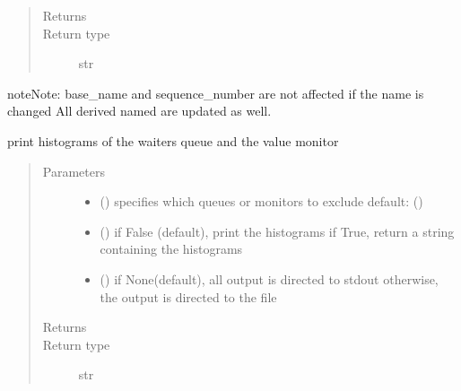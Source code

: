 \documentclass[letterpaper,10pt,english]{sphinxmanual}
\begin{document}
\begin{fulllineitems}
\begin{fulllineitems}
\begin{quote}
\begin{description}
\item[{Returns}] \leavevmode
{}

\item[{Return type}] \leavevmode
str

\end{description}\end{quote}

\begin{sphinxadmonition}{note}{Note:}
base\_name and sequence\_number are not affected if the name is changed 
All derived named are updated as well.
\end{sphinxadmonition}

\end{fulllineitems}


\begin{fulllineitems}
\label{\detokenize{Reference:salabim.State.print_histograms}}
print histograms of the waiters queue and the value monitor
\begin{quote}\begin{description}
\item[{Parameters}] \leavevmode\begin{itemize}
\item {} 
 () \textendash{} specifies which queues or monitors to exclude 
default: ()

\item {} 
 () \textendash{} if False (default), print the histograms
if True, return a string containing the histograms

\item {} 
 () \textendash{} if None(default), all output is directed to stdout 
otherwise, the output is directed to the file

\end{itemize}

\item[{Returns}] \leavevmode
{}

\item[{Return type}] \leavevmode
str


\end{description}
\end{quote}
\end{fulllineitems}
\end{fulllineitems}
\end{document}
